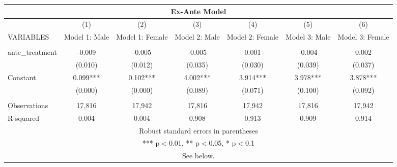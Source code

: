 \begin{tabular}{lcccccc}
\multicolumn{7}{c}{Ex-Ante Model} \\ \hline
 & (1) & (2) & (3) & (4) & (5) & (6) \\
VARIABLES & Model 1: Male & Model 1: Female & Model 2: Male & Model 2: Female & Model 3: Male & Model 3: Female \\ \hline
 &  &  &  &  &  &  \\
ante\_treatment & -0.009 & -0.005 & -0.005 & 0.001 & -0.004 & 0.002 \\
 & (0.010) & (0.012) & (0.035) & (0.030) & (0.039) & (0.037) \\
Constant & 0.099*** & 0.102*** & 4.002*** & 3.914*** & 3.978*** & 3.878*** \\
 & (0.000) & (0.000) & (0.089) & (0.071) & (0.100) & (0.092) \\
 &  &  &  &  &  &  \\
Observations & 17,816 & 17,942 & 17,816 & 17,942 & 17,816 & 17,942 \\
 R-squared & 0.004 & 0.004 & 0.908 & 0.913 & 0.909 & 0.914 \\ \hline
\multicolumn{7}{c}{ Robust standard errors in parentheses} \\
\multicolumn{7}{c}{ *** p$<$0.01, ** p$<$0.05, * p$<$0.1} \\
\multicolumn{7}{c}{ See below.} \\
\end{tabular}
